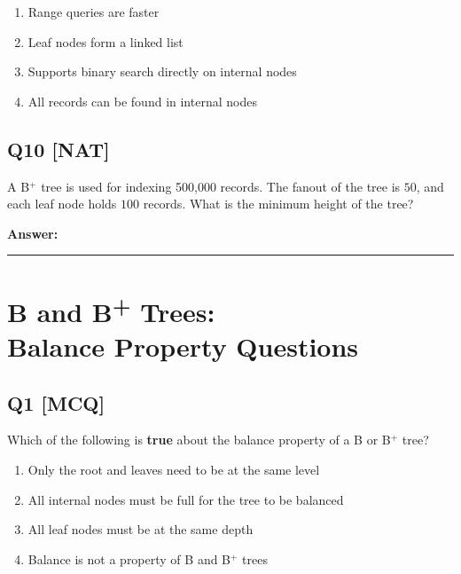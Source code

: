 \begin{enumerate}[label=(\alph*)]
    \item Range queries are faster  
    \item Leaf nodes form a linked list
    \item Supports binary search directly on internal nodes
    \item All records can be found in internal nodes
\end{enumerate}

\subsection*{Q10 [NAT]}
A B$^+$ tree is used for indexing 500,000 records. The fanout of the tree is $50$, and each leaf node holds $100$ records.  
What is the minimum height of the tree?

\textbf{Answer:} \rule{3cm}{0.15mm}


\section[B and B+ Trees: Balance Property Questions]
{B and B\textsuperscript{+} Trees:\\ Balance Property Questions}


\subsection*{Q1 [MCQ]}
Which of the following is \textbf{true} about the balance property of a B or B$^+$ tree?

\begin{enumerate}[label=(\alph*)]
    \item Only the root and leaves need to be at the same level
    \item All internal nodes must be full for the tree to be balanced
    \item All leaf nodes must be at the same depth
    \item Balance is not a property of B and B$^+$ trees
\end{enumerate}


